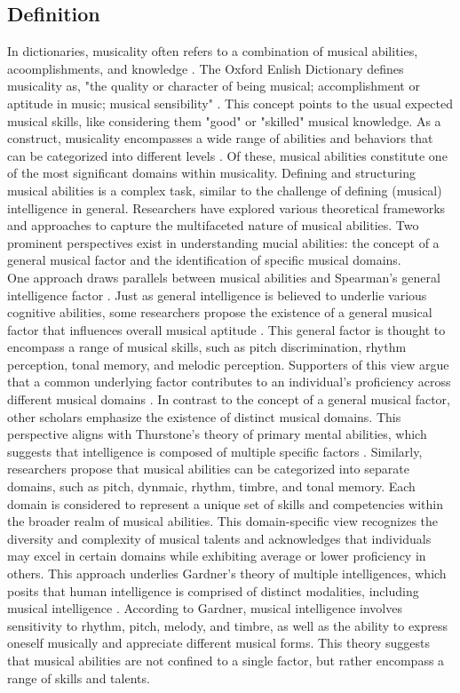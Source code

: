 \subsection{Definition}
In dictionaries, musicality often refers to a combination of musical abilities, acoomplishments, and  knowledge \cite{MerriamWebster}. The Oxford Enlish Dictionary defines musicality as, "the quality or character of being musical; accomplishment or aptitude in music; musical sensibility" \cite{OED}. This concept points to the usual expected musical skills, like considering them "good" or "skilled" musical knowledge. As a construct, musicality encompasses a wide range of abilities and behaviors that can be categorized into different levels \cite{Gembris1987}. Of these, musical abilities constitute one of the most significant domains within musicality. Defining and structuring musical abilities is a complex task, similar to the challenge of defining (musical) intelligence in general. Researchers have explored various theoretical frameworks and approaches to capture the multifaceted nature of musical abilities.
Two prominent perspectives exist in understanding mucial abilities: the concept of a general musical factor and the identification of specific musical domains.\\
One approach draws parallels between musical abilities and Spearman's general intelligence factor \cite{Spearman1904}. Just as general intelligence is believed to underlie various cognitive abilities, some researchers propose the existence of a general musical factor that influences overall musical aptitude \cite{Mackintosh2011}. This general factor is thought to encompass a range of musical skills, such as pitch discrimination, rhythm perception, tonal memory, and melodic perception. Supporters of this view argue that a common underlying factor contributes to an individual's proficiency across different musical domains \cite{Pausch2022}.
In contrast to the concept of a general musical factor, other scholars emphasize the existence of distinct musical domains. This perspective aligns with Thurstone's theory of primary mental abilities, which suggests that intelligence is composed of multiple specific factors \cite{Thurstone1931}. Similarly, researchers propose that musical abilities can be categorized into separate domains, such as pitch, dynmaic, rhythm, timbre, and tonal memory. Each domain is considered to represent a unique set of skills and competencies within the broader realm of musical abilities. This domain-specific view recognizes the diversity and complexity of musical talents and acknowledges that individuals may excel in certain domains while exhibiting average or lower proficiency in others. This approach underlies Gardner's theory of multiple intelligences, which posits that human intelligence is comprised of distinct modalities, including musical intelligence \cite{Gardner2006}. According to Gardner, musical intelligence involves sensitivity to rhythm, pitch, melody, and timbre, as well as the ability to express oneself musically and appreciate different musical forms. This theory suggests that musical abilities are not confined to a single factor, but rather encompass a range of skills and talents.
